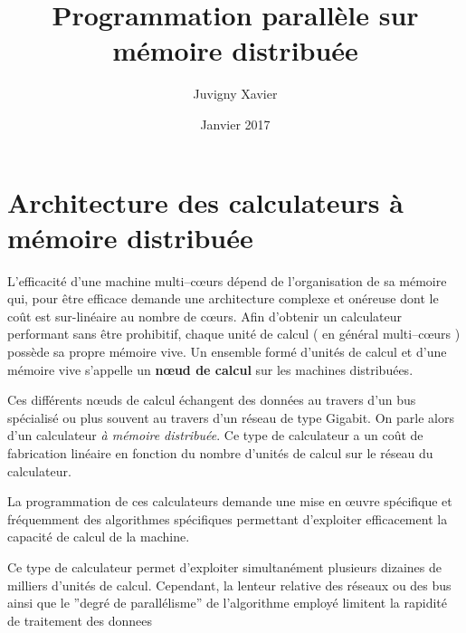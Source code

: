 \documentclass[fleqn,11pt]{article}
\title{Programmation parallèle sur mémoire distribuée}
\author{Juvigny Xavier}
\date{Janvier 2017}
\begin{document}
\maketitle
\tableofcontents

\section{Architecture des calculateurs à mémoire distribuée}

L'efficacité d'une machine multi--cœurs dépend de l'organisation de sa mémoire qui, pour être efficace demande une architecture complexe 
et onéreuse dont le coût est sur-linéaire au nombre de cœurs. Afin d'obtenir un calculateur performant sans être prohibitif, 
chaque unité de calcul ( en général multi--cœurs ) possède  sa propre mémoire vive. Un ensemble formé d'unités de calcul et 
d'une mémoire vive s'appelle un \textbf{nœud de calcul} sur les machines distribuées. 

Ces différents n{\oe}uds de calcul échangent des données au travers d'un bus spécialisé ou  plus souvent au travers d'un réseau de type 
Gigabit. On parle alors d'un calculateur \textsl{à mémoire distribuée}. Ce type de calculateur a un coût de fabrication linéaire en 
fonction du nombre d'unités de calcul sur le réseau du calculateur. 

La programmation de ces calculateurs demande une mise en œuvre spécifique et fréquemment des algorithmes spécifiques permettant d'exploiter efficacement la capacité de calcul de la machine.

Ce type de calculateur permet d'exploiter simultanément plusieurs dizaines de milliers d'unités de calcul. Cependant, la lenteur relative des réseaux ou des bus ainsi que le ''degré de parallélisme'' de l'algorithme employé limitent la rapidité de traitement des donnees
\end{document}
